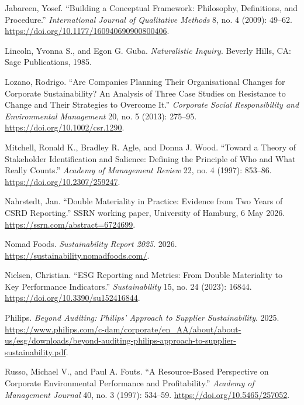 Jabareen, Yosef. ``Building a Conceptual Framework: Philosophy, Definitions, and Procedure.'' \emph{International Journal of Qualitative Methods} 8, no. 4 (2009): 49--62. \url{https://doi.org/10.1177/160940690900800406}. %

Lincoln, Yvonna S., and Egon G. Guba. \emph{Naturalistic Inquiry}. Beverly Hills, CA: Sage Publications, 1985. %

Lozano, Rodrigo. ``Are Companies Planning Their Organisational Changes for Corporate Sustainability? An Analysis of Three Case Studies on Resistance to Change and Their Strategies to Overcome It.'' \emph{Corporate Social Responsibility and Environmental Management} 20, no. 5 (2013): 275--95. \url{https://doi.org/10.1002/csr.1290}.

Mitchell, Ronald K., Bradley R. Agle, and Donna J. Wood. ``Toward a Theory of Stakeholder Identification and Salience: Defining the Principle of Who and What Really Counts.'' \emph{Academy of Management Review} 22, no. 4 (1997): 853--86. \url{https://doi.org/10.2307/259247}. %

Nahrstedt, Jan. ``Double Materiality in Practice: Evidence from Two Years of CSRD Reporting.'' SSRN working paper, University of Hamburg, 6 May 2026. \url{https://ssrn.com/abstract=6724699}.

Nomad Foods. \emph{Sustainability Report 2025}. 2026. \url{https://sustainability.nomadfoods.com/}. %

Nielsen, Christian. ``ESG Reporting and Metrics: From Double Materiality to Key Performance Indicators.'' \emph{Sustainability} 15, no. 24 (2023): 16844. \url{https://doi.org/10.3390/su152416844}.

Philips. \emph{Beyond Auditing: Philips' Approach to Supplier Sustainability}. 2025. \url{https://www.philips.com/c-dam/corporate/en\_AA/about/about-us/esg/downloads/beyond-auditing-philips-approach-to-supplier-sustainability.pdf}. %

Russo, Michael V., and Paul A. Fouts. ``A Resource-Based Perspective on Corporate Environmental Performance and Profitability.'' \emph{Academy of Management Journal} 40, no. 3 (1997): 534--59. \url{https://doi.org/10.5465/257052}. %

